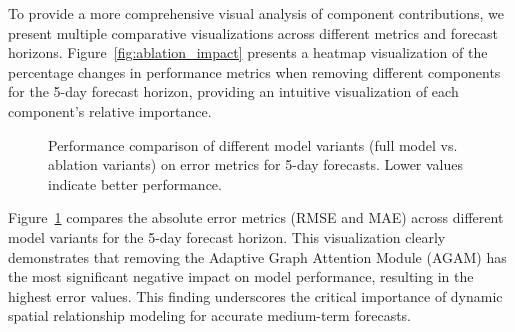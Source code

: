 \documentclass[lettersize, journal]{IEEEtran}
\begin{document}
To provide a more comprehensive visual analysis of component contributions, we present multiple comparative visualizations across different metrics and forecast horizons. Figure~\ref{fig:ablation_impact} presents a heatmap visualization of the percentage changes in performance metrics when removing different components for the 5-day forecast horizon, providing an intuitive visualization of each component's relative importance.

\begin{figure}[htbp]
    \centering
    \hfill
    \caption{Performance comparison of different model variants (full model vs. ablation variants) on error metrics for 5-day forecasts. Lower values indicate better performance.}
    \label{fig:ablation_error_metrics}
\end{figure}

Figure~\ref{fig:ablation_error_metrics} compares the absolute error metrics (RMSE and MAE) across different model variants for the 5-day forecast horizon. This visualization clearly demonstrates that removing the Adaptive Graph Attention Module (AGAM) has the most significant negative impact on model performance, resulting in the highest error values. This finding underscores the critical importance of dynamic spatial relationship modeling for accurate medium-term forecasts.
\end{document}
